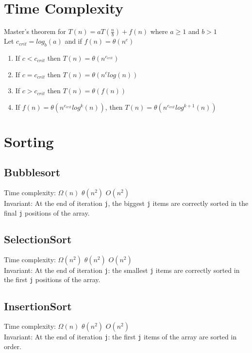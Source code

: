 \documentclass[10pt,landscape,a4paper]{article}
\begin{document}
\small
\begin{multicols*}{4}
\section{Time Complexity}
{Master's theorem for $T(n) = aT(\frac{n}{b}) + f(n)$ where $a \geq 1$ and $b > 1$} \\
Let $c_{crit} = log_b(a)$ and if $f(n) = \theta(n^c)$
\begin{enumerate}
    \item {If $c < c_{crit}$ then $T(n) = \theta(n^{c_{crit}})$} 
    \item {If $c = c_{crit}$ then $T(n) = \theta(n^clog(n))$} 
    \item {If $c > c_{crit}$ then $T(n) = \theta(f(n))$} 
    \item {If $f(n) = \theta(n^{c_{crit}}log^k(n))$, then $T(n) = \theta(n^{c_{crit}}log^{k+1}(n))$} 

\end{enumerate}

\section{Sorting}
\subsection{Bubblesort}
Time complexity: $\Omega({n})$ $\theta(n^2)$ $O(n^2)$ \\
Invariant: At the end of iteration \texttt{j}, the biggest \texttt{j} items are correctly sorted in the final \texttt{j} positions of the array.

\subsection{SelectionSort}
Time complexity: $\Omega({n^2})$ $\theta(n^2)$ $O(n^2)$ \\
Invariant: At the end of iteration \texttt{j}: the smallest \texttt{j} items are correctly sorted in the first \texttt{j} positions of the array.

\subsection{InsertionSort}
Time complexity: $\Omega({n})$ $\theta(n^2)$ $O(n^2)$ \\
Invariant: At the end of iteration \texttt{j}: the first \texttt{j} items of the array are sorted in order.


\end{multicols*}
\end{document}
